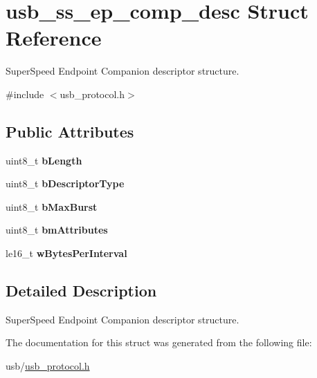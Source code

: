 \hypertarget{structusb__ss__ep__comp__desc}{}\section{usb\+\_\+ss\+\_\+ep\+\_\+comp\+\_\+desc Struct Reference}
\label{structusb__ss__ep__comp__desc}


Super\+Speed Endpoint Companion descriptor structure.  




{\ttfamily \#include $<$usb\+\_\+protocol.\+h$>$}

\subsection*{Public Attributes}
\begin{DoxyCompactItemize}
\item 
\mbox{\label{structusb__ss__ep__comp__desc_af9d0195aaab4a37c52ad6edcc5806367}} 
uint8\+\_\+t {\bfseries b\+Length}
\item 
\mbox{\label{structusb__ss__ep__comp__desc_ac2fc737ba2260849245611141189b461}} 
uint8\+\_\+t {\bfseries b\+Descriptor\+Type}
\item 
\mbox{\label{structusb__ss__ep__comp__desc_a0fb42426d9d4c5633d72da98e899e510}} 
uint8\+\_\+t {\bfseries b\+Max\+Burst}
\item 
\mbox{\label{structusb__ss__ep__comp__desc_a02e3cf8a47204f86f9be3189f7645f68}} 
uint8\+\_\+t {\bfseries bm\+Attributes}
\item 
\mbox{\label{structusb__ss__ep__comp__desc_a101d1f8e0fe61f72e999a9149dcfa091}} 
le16\+\_\+t {\bfseries w\+Bytes\+Per\+Interval}
\end{DoxyCompactItemize}


\subsection{Detailed Description}
Super\+Speed Endpoint Companion descriptor structure. 

The documentation for this struct was generated from the following file\+:\begin{DoxyCompactItemize}
\item 
usb/\hyperlink{usb__protocol_8h}{usb\+\_\+protocol.\+h}\end{DoxyCompactItemize}
